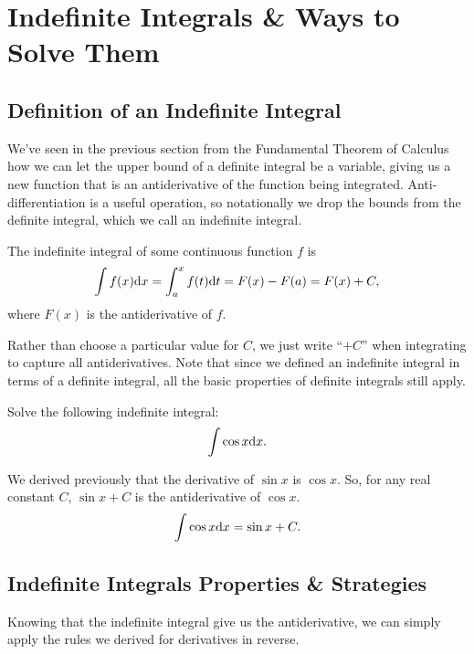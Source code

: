 \section{Indefinite Integrals \& Ways to Solve Them}

\subsection{Definition of an Indefinite Integral}
We've seen in the previous section from the Fundamental Theorem of Calculus how we can let the upper bound of a definite integral be a variable, giving us a new function that is an antiderivative of the function being integrated.
Anti-differentiation is a useful operation, so notationally we drop the bounds from the definite integral, which we call an indefinite integral.
\begin{definition}
	The indefinite integral of some continuous function $f$ is
	\begin{equation*}
		\int{f(x)\mathrm{d} x} = \int_{a}^{x}{f(t)\mathrm{d} t} = F(x) - F(a) = F(x) + C,
	\end{equation*}
	where $F(x)$ is the antiderivative of $f$.
\end{definition}

Rather than choose a particular value for $C$, we just write ``$+C$'' when integrating to capture all antiderivatives.
Note that since we defined an indefinite integral in terms of a definite integral, all the basic properties of definite integrals still apply.

\begin{example}
	Solve the following indefinite integral:
	\begin{equation*}
		\int{\cos{x}\mathrm{d} x}.
	\end{equation*}
\end{example}
\begin{answer}
	We derived previously that the derivative of $\sin{x}$ is $\cos{x}$.
	So, for any real constant $C$, $\sin{x} + C$ is the antiderivative of $\cos{x}$.
	\begin{equation*}
		\int{\cos{x}\mathrm{d} x} = \sin{x} + C.
	\end{equation*}
\end{answer}

\subsection{Indefinite Integrals Properties \& Strategies}
Knowing that the indefinite integral give us the antiderivative, we can simply apply the rules we derived for derivatives in reverse.

